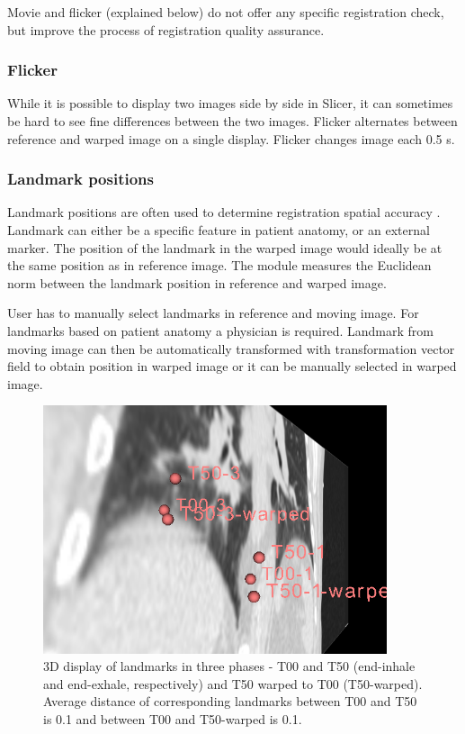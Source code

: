 \documentclass[type=dr, dr=rernat, accentcolor=tud7b,colorbacktitle, bigchapter, openright, twoside, 12pt ]{tudthesis}
\begin{document}
Movie and flicker (explained below) do not offer any specific registration check, but improve the process of registration quality assurance.

\subsubsection{Flicker}

While it is possible to display two images side by side in Slicer, it can sometimes be hard to see fine differences between the two images. Flicker alternates between reference and warped image on a single display. Flicker changes image each 0.5 s.

\subsubsection{Landmark positions}

Landmark positions are often used to determine registration spatial accuracy \cite{Castillo2009}. Landmark can either be a specific feature in patient anatomy, or an external marker. The position of the landmark in the warped image would ideally be at the same position as in reference image. The module measures the Euclidean norm between the landmark position in reference and warped image.

User has to manually select landmarks in reference and moving image. For landmarks based on patient anatomy a physician is required. Landmark from moving image can then be automatically transformed with transformation vector field to obtain position in warped image or it can be manually selected in warped image.

\begin{figure}[H]
\begin{center}
\includegraphics[width=0.9\textwidth]{./Images/landmark.png}
\caption{3D display of landmarks in three phases - T00 and T50 (end-inhale and end-exhale, respectively) and T50 warped to T00 (T50-warped). Average distance of corresponding landmarks between T00 and T50 is 0.1 and between T00 and T50-warped is 0.1.}
\label{inv}
\end{center}
\end{figure}
\end{document}
